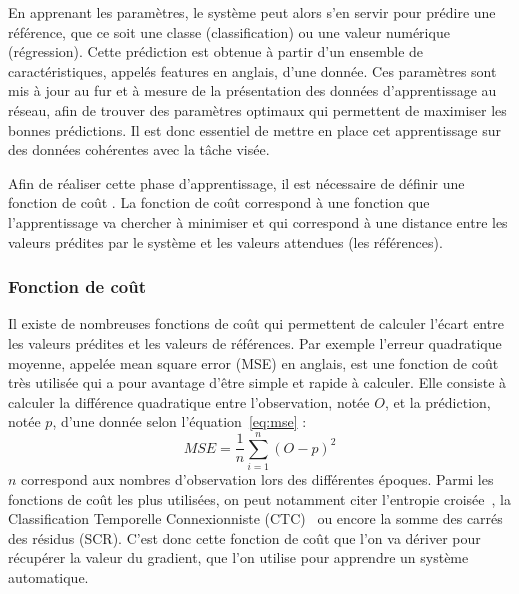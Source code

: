 En apprenant les paramètres, le système peut alors s'en servir pour prédire une référence, que ce soit une classe (classification) ou une valeur numérique (régression). Cette prédiction est obtenue à partir d'un ensemble de caractéristiques, appelés features en anglais, d'une donnée. Ces paramètres sont mis à jour au fur et à mesure de la présentation des données d'apprentissage au réseau, afin de trouver des paramètres optimaux qui permettent de maximiser les bonnes prédictions. Il est donc essentiel de mettre en place cet apprentissage sur des données cohérentes avec la tâche visée.

Afin de réaliser cette phase d'apprentissage, il est nécessaire de définir une fonction de coût%
. La fonction de coût correspond à une fonction que l'apprentissage va chercher à minimiser et qui correspond à une distance entre les valeurs prédites par le système et les valeurs attendues (les références). %

\subsubsection{Fonction de coût}
Il existe de nombreuses fonctions de coût qui permettent de calculer l'écart entre les valeurs prédites et les valeurs de références. %
Par exemple l'erreur quadratique moyenne, appelée mean square error (MSE) en anglais, est une fonction de coût très utilisée qui a pour avantage d'être simple et rapide à calculer. Elle consiste à calculer la différence quadratique entre l'observation, notée $O$, et la prédiction, notée $p$, d'une donnée selon l'équation~\ref{eq:mse} :
\begin{equation}
  MSE = \frac{1}{n}\sum_{i=1}^{n}(O-p)^2
  \label{eq:mse}
\end{equation}
$n$ correspond aux nombres d'observation lors des différentes époques. Parmi les fonctions de coût les plus utilisées, on peut notamment citer l'entropie croisée~\cite{Stemmer2002}, la Classification Temporelle Connexionniste (CTC)~\cite{Graves2006} ou encore la somme des carrés des résidus (SCR). C'est donc cette fonction de coût que l'on va dériver pour récupérer la valeur du gradient, que l'on utilise pour apprendre un système automatique.

